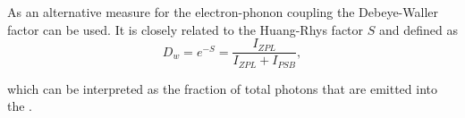    As an alternative measure for the electron-phonon coupling the Debeye-Waller factor can be used. It is closely related to the Huang-Rhys factor $S$ and defined as
% 
   \begin{equation}
     D_w = e^{-S} = \frac{I_{ZPL}}{I_{ZPL} + I_{PSB}},
   \end{equation}

    which can be interpreted as the fraction of total photons that are emitted into the \zpl.





    



